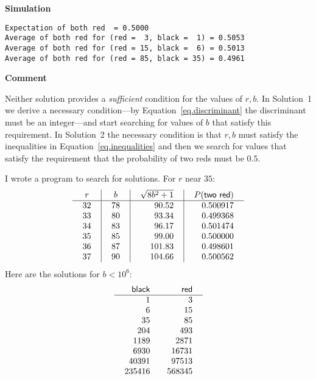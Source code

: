 \medskip
\textbf{Simulation}
\begin{verbatim}
Expectation of both red  = 0.5000
Average of both red for (red =  3, black =  1) = 0.5053
Average of both red for (red = 15, black =  6) = 0.5013
Average of both red for (red = 85, black = 35) = 0.4961
\end{verbatim}

\textbf{Comment}

Neither solution provides a \emph{sufficient} condition for the values of $r,b$. In Solution~1 we derive a necessary condition---by Equation~\ref{eq.discriminant} the discriminant must be an integer---and start searching for values of $b$ that satisfy this requirement. In Solution~2 the necessary condition is that $r,b$ must satisfy the inequalities in Equation~\ref{eq.inequalities} and then we search for values that satisfy the requirement that the probability of two reds must be $0.5$.

I wrote a program to search for solutions. For $r$ near $35$:
\[
\renewcommand{\arraycolsep}{12pt}
\begin{array}{r|r|r|r}
\multicolumn{1}{c|}{r}&
\multicolumn{1}{c|}{b}&
\multicolumn{1}{c|}{\sqrt{8b^2+1}}&
\multicolumn{1}{c}{P(\textsf{two red})} \\\hline
32 & 78  & 90.52 & 0.500917\\
33 & 80  & 93.34 & 0.499368\\
34 & 83  & 96.17 & 0.501474\\
35 & 85  & 99.00 & 0.500000\\
36 & 87  &101.83 & 0.498601\\
37 & 90  &104.66 & 0.500562
\end{array}
\]
Here are the solutions for $b<10^6$:
\[
\begin{array}{r@{\hspace{2em}}r}
\textsf{black} & \textsf{red}\\\hline
1 & 3 \\
6 & 15\\
35 &  85\\
204 &  493\\
1189 &  2871\\
6930 & 16731\\
40391 &  97513\\
235416 & 568345
\end{array}
\]


